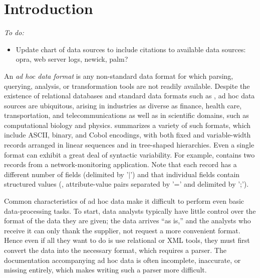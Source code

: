 \section{Introduction}
\label{sec:intro}

{\em
To do:
\begin{itemize}
\item Update chart of data sources to include citations to available
  data sources: opra, web server logs, newick, palm?
\end{itemize}
}

An {\em ad hoc data format} is any non-standard data format for which
parsing, querying, analysis, or transformation tools are not readily
available.  Despite the existence of relational databases and standard
data formats such as \xml{}, ad hoc data sources are ubiquitous,
arising in industries as diverse as finance, health care,
transportation, and telecommunications as well as in scientific
domains, such as computational biology and physics.
 summarizes a variety of such formats,
which include ASCII, binary, and Cobol encodings, with both fixed and
variable-width records arranged in linear sequences and in tree-shaped
hierarchies.  Even a single format can exhibit a great deal of
syntactic variability.  For example, 
contains two records from a network-monitoring application.  Note that
each record has a different number of fields (delimited by '$|$') and
that individual fields contain structured values (\eg{},
attribute-value pairs separated by '=' and delimited by ';').

Common characteristics of ad hoc data make it difficult to 
perform even basic data-processing tasks.  To start, data analysts
typically have little control over the format of the data they are
given;  the data arrives ``as is,'' and the analysts
who receive it can only thank the supplier, not request a more
convenient format.  Hence even if all they want to do is use 
relational or XML tools, they must first convert the data into the
necessary format, which requires a parser.  
The documentation accompanying ad hoc data is often incomplete,
inaccurate, or missing entirely, which makes writing such a parser
more difficult.  

